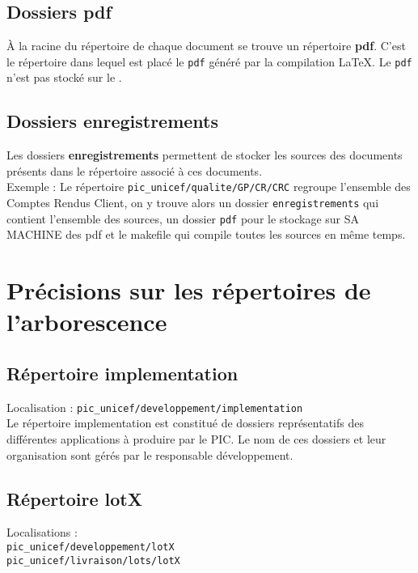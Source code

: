 \subsection{Dossiers pdf}

\`{A} la racine du répertoire de chaque document se trouve un répertoire \textbf{pdf}. C'est
le répertoire dans lequel est placé le \verb+pdf+ généré par la compilation \LaTeX{}. Le \verb+pdf+ n'est pas stocké sur le \git{}.

\subsection{Dossiers enregistrements}

Les dossiers \textbf{enregistrements} permettent de stocker les sources des documents présents dans le répertoire associé à ces documents.\\
Exemple : Le répertoire \verb+pic_unicef/qualite/GP/CR/CRC+ regroupe l'ensemble des Comptes Rendus Client, on y trouve alors un dossier \verb+enregistrements+ qui contient l'ensemble des sources, un dossier \verb+pdf+ pour le stockage sur SA MACHINE des pdf et le makefile qui compile toutes les sources en même temps.



\section{Précisions sur les répertoires de l'arborescence}

\subsection{Répertoire implementation}

Localisation : \verb+pic_unicef/developpement/implementation+\\

Le répertoire implementation est constitué de dossiers représentatifs des différentes applications à produire par le PIC. Le nom de ces dossiers et leur organisation sont gérés par le responsable développement.

\subsection{Répertoire lotX}

Localisations : \\
\verb+pic_unicef/developpement/lotX+\\ 
\verb+pic_unicef/livraison/lots/lotX+\\

